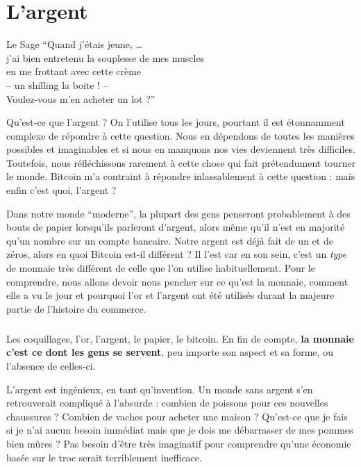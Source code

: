 \chapter{L'argent}
\label{les:11}

\begin{chapquote}{Le Sage}
\enquote{Quand j'étais jeune, \ldots \\
j'ai bien entretenu la souplesse de mes muscles \\
en me frottant avec cette crème \\
-- un shilling la boite ! – \\
Voulez-vous m'en acheter un lot ?}
\end{chapquote}

Qu'est-ce que l'argent ? On l'utilise tous les jours, pourtant il est
étonnamment complexe de répondre à cette question. Nous en dépendons de toutes
les manières possibles et imaginables et si nous en manquons nos vies deviennent
très difficiles. Toutefois, nous réfléchissons rarement à cette chose qui fait
prétendument tourner le monde. Bitcoin m'a contraint à répondre inlassablement à
cette question : mais enfin c'est quoi, l'argent ?

Dans notre monde \enquote{moderne}, la plupart des gens penseront probablement à
des bouts de papier lorsqu'ils parleront d'argent, alors même qu'il n'est en
majorité qu'un nombre sur un compte bancaire. Notre argent est déjà fait de un
et de zéros, alors en quoi Bitcoin est-il différent ? Il l'est car en son sein,
c'est un \textit{type} de monnaie très différent de celle que l'on utilise
habituellement. Pour le comprendre, nous allons devoir nous pencher sur ce
qu'est la monnaie, comment elle a vu le jour et pourquoi l'or et l'argent ont
été utilisés durant la majeure partie de l'histoire du commerce.

\paragraph{}
Les coquillages, l'or, l'argent, le papier, le bitcoin. En fin de compte,
\textbf{la monnaie c'est ce dont les gens se servent}, peu importe son aspect et
sa forme, ou l'absence de celles-ci.

L'argent est ingénieux, en tant qu'invention. Un monde sans argent s'en
retrouverait compliqué à l'absurde : combien de poissons pour ces nouvelles
chaussures ? Combien de vaches pour acheter une maison ? Qu'est-ce que je fais
si je n'ai aucun besoin immédiat mais que je dois me débarrasser de mes pommes
bien mûres ? Pas besoin d'être très imaginatif pour comprendre qu'une économie
basée sur le troc serait terriblement inefficace.

